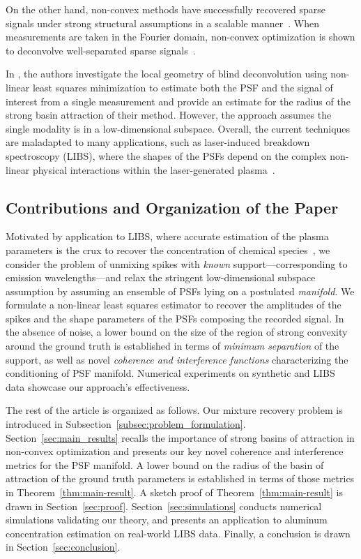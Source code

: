 \documentclass[conference,english,final,svgnames]{IEEEtran}
\begin{document}
On the other hand, non-convex methods have successfully recovered sparse signals under strong structural assumptions in a scalable manner~\cite{traonmilin2020basins,traonmilin2024strong}. When measurements are taken in the Fourier domain, non-convex optimization is shown to deconvolve well-separated sparse signals~\cite{costa_local_2023, gabet2025global}.

In \cite{LI2019893}, the authors investigate the local geometry of blind deconvolution using non-linear least squares minimization to estimate both the PSF and the signal of interest from a single measurement and provide an estimate for the radius of the strong basin attraction of their method. However, the approach assumes the single modality is in a low-dimensional subspace. Overall, the current techniques are maladapted to many applications, such as laser-induced breakdown spectroscopy (LIBS), where the shapes of the PSFs depend on the complex non-linear physical interactions within the laser-generated plasma~\cite{mars-spectrum-fitting}.

\subsection{Contributions and Organization of the Paper}

Motivated by application to LIBS, where accurate estimation of the plasma parameters is the crux to recover the concentration of chemical species~\cite{HU2022116618}, we consider the problem of unmixing spikes with \emph{known} support---corresponding to emission wavelengths---and relax the stringent low-dimensional subspace assumption by assuming an ensemble of PSFs lying on a postulated \emph{manifold}. We formulate a non-linear least squares estimator to recover the amplitudes of the spikes and the shape parameters of the PSFs composing the recorded signal. In the absence of noise, a lower bound on the size of the region of strong convexity around the ground truth is established in terms of \emph{minimum separation} of the support, as well as novel  \emph{coherence and interference functions} characterizing the conditioning of PSF manifold. Numerical experiments on synthetic and LIBS data showcase our approach's effectiveness.

The rest of the article is organized as follows. Our mixture recovery problem is introduced in Subsection~\ref{subsec:problem_formulation}. Section~\ref{sec:main_results} recalls the importance of strong basins of attraction in non-convex optimization and presents our key novel coherence and interference metrics for the PSF manifold. A lower bound on the radius of the basin of attraction of the ground truth parameters is established in terms of those metrics in Theorem~\ref{thm:main-result}. A sketch proof of Theorem~\ref{thm:main-result} is drawn in Section~\ref{sec:proof}. Section~\ref{sec:simulations} conducts numerical simulations validating our theory, and presents an application to aluminum concentration estimation on real-world LIBS data. Finally, a conclusion is drawn in Section~\ref{sec:conclusion}.
\end{document}
